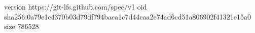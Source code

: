 version https://git-lfs.github.com/spec/v1
oid sha256:0a79e1c4370b03d79df794baca1c7d44caa2e74ad6cd51a806902f41321e15a0
size 786528

